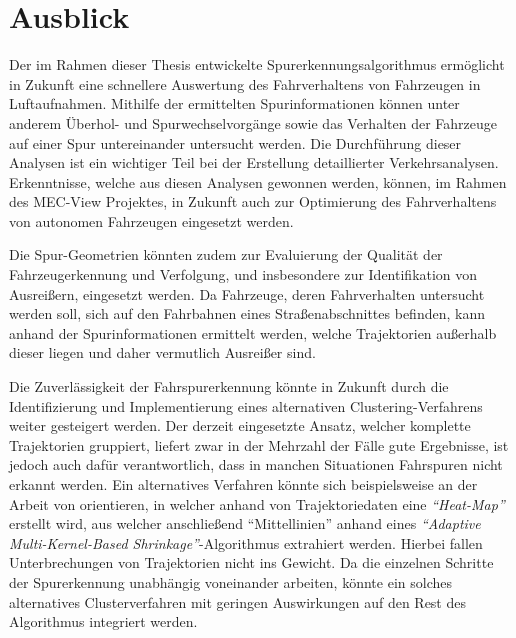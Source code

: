 


\section{Ausblick}

Der im Rahmen dieser Thesis entwickelte Spurerkennungsalgorithmus ermöglicht in Zukunft eine schnellere Auswertung
des Fahrverhaltens von Fahrzeugen in Luftaufnahmen. Mithilfe der ermittelten Spurinformationen können
unter anderem Überhol- und Spurwechselvorgänge sowie das Verhalten der Fahrzeuge auf einer Spur
untereinander untersucht werden. Die Durchführung dieser Analysen ist ein wichtiger Teil bei der Erstellung
detaillierter Verkehrsanalysen. Erkenntnisse, welche aus diesen Analysen gewonnen werden, können, im
Rahmen des MEC-View Projektes, in Zukunft auch zur Optimierung des Fahrverhaltens von autonomen
Fahrzeugen eingesetzt werden.

Die Spur-Geometrien könnten zudem zur Evaluierung der Qualität der Fahrzeugerkennung und Verfolgung,
und insbesondere zur Identifikation von Ausreißern, eingesetzt werden.
Da Fahrzeuge, deren Fahrverhalten untersucht werden soll, sich auf den Fahrbahnen eines Straßenabschnittes befinden,
kann anhand der Spurinformationen ermittelt werden, welche Trajektorien außerhalb dieser liegen und
daher vermutlich Ausreißer sind.

Die Zuverlässigkeit der Fahrspurerkennung könnte in Zukunft durch die Identifizierung und Implementierung
eines alternativen Clustering-Verfahrens weiter gesteigert werden.
Der derzeit eingesetzte Ansatz, welcher komplette Trajektorien gruppiert, liefert zwar in der Mehrzahl der Fälle
gute Ergebnisse, ist jedoch auch dafür verantwortlich, dass in manchen Situationen Fahrspuren nicht erkannt werden.
Ein alternatives Verfahren könnte sich beispielsweise an der Arbeit von \cite[]{Xu2015} orientieren, in welcher
anhand von Trajektoriedaten eine \textit{``Heat-Map''} erstellt wird, aus welcher anschließend ``Mittellinien''
anhand eines \textit{``Adaptive Multi-Kernel-Based Shrinkage''}-Algorithmus extrahiert werden.
Hierbei fallen Unterbrechungen von Trajektorien nicht ins Gewicht.
Da die einzelnen Schritte der Spurerkennung unabhängig voneinander arbeiten, könnte ein
solches alternatives Clusterverfahren mit geringen Auswirkungen auf den Rest des Algorithmus integriert werden.